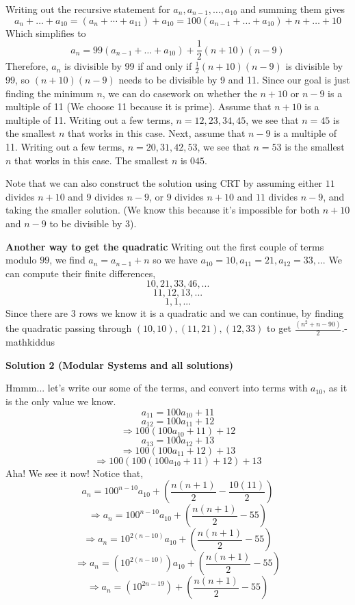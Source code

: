 \begin{enumerate}
Writing out the recursive statement for $a_n, a_{n-1}, \dots, a_{10}$ and summing them gives 
 \[a_n+\dots+a_{10}=(a_n+\cdots+a_{11})+a_{10}=100(a_{n-1}+\dots+a_{10})+n+\dots+10\]Which simplifies to 
 \[a_n=99(a_{n-1}+\dots+a_{10})+\frac{1}{2}(n+10)(n-9)\]Therefore, $a_n$ is divisible by 99 if and only if $\frac{1}{2}(n+10)(n-9)$ is divisible by 99, so $(n+10)(n-9)$ needs to be divisible by 9 and 11. Since our goal is just finding the minimum $n$, we can do casework on whether the $n+10$ or $n-9$ is a multiple of 11 (We choose 11 because it is prime). Assume that $n+10$ is a multiple of 11. Writing out a few terms, $n=12, 23, 34, 45$, we see that $n=45$ is the smallest $n$ that works in this case. Next, assume that $n-9$ is a multiple of 11. Writing out a few terms, $n=20, 31, 42, 53$, we see that $n=53$ is the smallest $n$ that works in this case. The smallest $n$ is $\boxed{045}$.

 Note that we can also construct the solution using CRT by assuming either $11$ divides $n+10$ and $9$ divides $n-9$, or $9$ divides $n+10$ and $11$ divides $n-9$, and taking the smaller solution. (We know this because it's impossible for both $n+10$ and $n-9$ to be divisible by 3).

 \textbf{Another way to get the quadratic} Writing out the first couple of terms modulo $99$, we find $a_n = a_{n-1}+n$ so we have $a_{10}=10,a_{11}=21,a_{12}=33,...$ We can compute their finite differences, 
 \[10,21,33,46,...\]
 \[11,12,13,...\]
 \[1,1,...\] Since there are 3 rows we know it is a quadratic and we can continue, by finding the quadratic passing through $(10,10),(11,21),(12,33)$ to get $\frac{(n^2+n-90)}{2}.$-mathkiddus

 



\textbf{Solution 2 (Modular Systems and all solutions)}

Hmmm... let's write our some of the terms, and convert into terms with $a_{10}$, as it is the only value we know.
 \[a_{11} = 100a_{10} + 11\]
 \[a_{12} = 100a_{11} + 12\]
 \[\Rightarrow 100(100a_{10}+11)+12\]
 \[a_{13} = 100a_{12} + 13\]
 \[\Rightarrow 100(100a_{11}+12)+13\]
 \[\Rightarrow 100(100(100a_{10}+11)+12)+13\]Aha! We see it now! Notice that,
 \[a_n = 100^{n-10}a_{10} + \left( \frac{n(n+1)}{2} - \frac{10(11)}{2} \right)\]
 \[\Rightarrow a_n=100^{n-10}a_{10} + \left( \frac{n(n+1)}{2} -55 \right)\]
 \[\Rightarrow a_n = 10^{2(n-10)}a_{10}+\left(\frac{n(n+1)}{2}-55\right)\]
 \[\Rightarrow a_n=(10^{2(n-10)})a_{10}+\left(\frac{n(n+1)}{2}-55\right)\]
 \[\Rightarrow a_n=(10^{2n-19})+\left(\frac{n(n+1)}{2}-55\right)\]


\end{enumerate}
